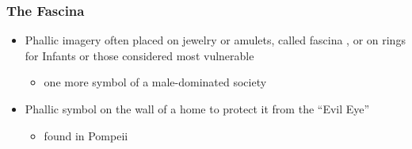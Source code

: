 \documentclass[12pt, twoside]{article}
\begin{document}
\subsubsection{The Fascina}
\begin{itemize}
\item Phallic imagery often placed on jewelry or amulets, called fascina , or on rings for Infants or those considered most vulnerable
	\begin{itemize}
	\item one more symbol of a male-dominated society
	\end{itemize}
\item Phallic symbol on the wall of a home to protect it from the “Evil Eye”
	\begin{itemize}
	\item found in Pompeii
	\end{itemize}
\end{itemize}
\end{document}
